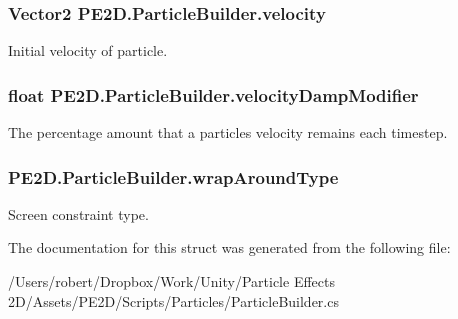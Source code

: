 \subsubsection[{velocity}]{\setlength{\rightskip}{0pt plus 5cm}Vector2 P\+E2\+D.\+Particle\+Builder.\+velocity}\label{struct_p_e2_d_1_1_particle_builder_a5efd39fc998887c16fa23eff2fdf8d4d}


Initial velocity of particle. 

\hypertarget{struct_p_e2_d_1_1_particle_builder_aff988495a250de55e362b008dc471f9d}{}
\subsubsection[{velocity\+Damp\+Modifier}]{\setlength{\rightskip}{0pt plus 5cm}float P\+E2\+D.\+Particle\+Builder.\+velocity\+Damp\+Modifier}\label{struct_p_e2_d_1_1_particle_builder_aff988495a250de55e362b008dc471f9d}


The percentage amount that a particles velocity remains each timestep. 

\hypertarget{struct_p_e2_d_1_1_particle_builder_ae8a54269a26406d7fb499c4fee198ea2}{}
\subsubsection[{wrap\+Around\+Type}]{ P\+E2\+D.\+Particle\+Builder.\+wrap\+Around\+Type}\label{struct_p_e2_d_1_1_particle_builder_ae8a54269a26406d7fb499c4fee198ea2}


Screen constraint type. 



The documentation for this struct was generated from the following file\+:\begin{DoxyCompactItemize}
\item 
/\+Users/robert/\+Dropbox/\+Work/\+Unity/\+Particle Effects 2\+D/\+Assets/\+P\+E2\+D/\+Scripts/\+Particles/Particle\+Builder.\+cs\end{DoxyCompactItemize}
